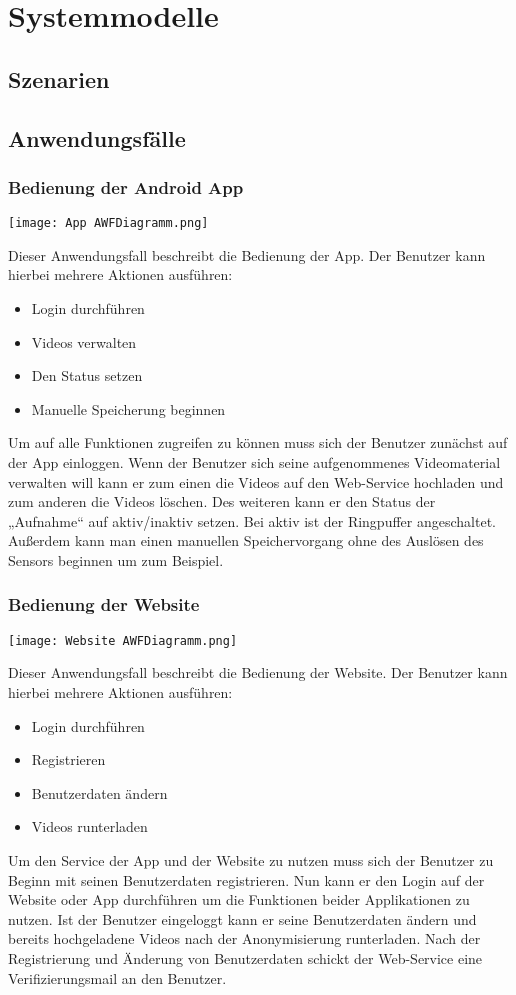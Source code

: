 \section{Systemmodelle}


\subsection{Szenarien}


\subsection{Anwendungsfälle}
\subsubsection{Bedienung der Android App}
\begin{center}
\texttt{[image: App AWFDiagramm.png]}
\end{center}
Dieser Anwendungsfall beschreibt die Bedienung der App. 
Der Benutzer kann hierbei mehrere Aktionen ausführen:
\begin{itemize}
\item Login durchführen
\item Videos verwalten
\item Den Status setzen
\item Manuelle Speicherung beginnen
\end{itemize}
Um auf alle Funktionen zugreifen zu können muss sich der Benutzer zunächst auf der App einloggen. 
Wenn der Benutzer sich seine aufgenommenes Videomaterial verwalten will kann er zum einen die Videos auf den Web-Service hochladen und zum anderen die Videos löschen.
Des weiteren kann er den Status der „Aufnahme“ auf aktiv/inaktiv setzen. Bei aktiv ist der Ringpuffer angeschaltet. 
Außerdem kann man einen manuellen Speichervorgang ohne des Auslösen des Sensors beginnen um zum Beispiel.


\subsubsection{Bedienung der Website}
\begin{center}
\texttt{[image: Website AWFDiagramm.png]}
\end{center}
Dieser Anwendungsfall beschreibt die Bedienung der Website.
Der Benutzer kann hierbei mehrere Aktionen ausführen:
\begin{itemize}
\item Login durchführen
\item Registrieren
\item Benutzerdaten ändern
\item Videos runterladen
\end{itemize}
Um den Service der App und der Website zu nutzen muss sich der Benutzer zu Beginn mit seinen Benutzerdaten registrieren. 
Nun kann er den Login auf der Website oder App durchführen um die Funktionen beider Applikationen zu nutzen. 
Ist der Benutzer eingeloggt kann er seine Benutzerdaten ändern und bereits hochgeladene Videos nach der Anonymisierung runterladen.
Nach der Registrierung und Änderung von Benutzerdaten schickt der Web-Service eine Verifizierungsmail an den Benutzer.


